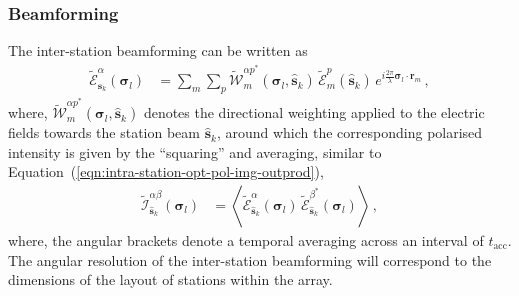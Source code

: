 \documentclass[
  journal=pasa,
  manuscript=article-type,
  year=2020,
  volume=37,
]{cup-journal}
\begin{document}
\subsubsection{Beamforming}

The inter-station beamforming 
can be written as
\begin{align}
    \widetilde{\mathcal{E}}_{\hat{\boldsymbol{s}}_k}^\alpha(\boldsymbol{\sigma}_l) &= \sum_{m} \sum_p  \widetilde{\mathcal{W}}_{m}^{{\alpha p}^*}(\boldsymbol{\sigma}_l,\hat{\boldsymbol{s}}_k) \, \widetilde{\mathcal{E}}_m^p(\hat{\boldsymbol{s}}_k) \, e^{i\frac{2\pi}{\lambda} \boldsymbol{\sigma}_l\cdot\boldsymbol{r}_{m}} \, , \label{eqn:inter-station-pol-hol-img-expl}   
\end{align}
where, $\widetilde{\mathcal{W}}_{m}^{{\alpha p}^*}(\boldsymbol{\sigma}_l,\hat{\boldsymbol{s}}_k)$ denotes the directional weighting applied to the electric fields towards the station beam $\hat{\boldsymbol{s}}_k$, around which the corresponding polarised intensity 
is given by the ``squaring'' and averaging, similar to Equation~(\ref{eqn:intra-station-opt-pol-img-outprod}),
\begin{align}
    \widetilde{\mathcal{I}}^{\alpha\beta}_{\hat{\boldsymbol{s}}_k}(\boldsymbol{\sigma}_l) &= \left\langle \widetilde{\mathcal{E}}_{\hat{\boldsymbol{s}}_k}^\alpha(\boldsymbol{\sigma}_l) \,  \widetilde{\mathcal{E}}_{\hat{\boldsymbol{s}}_k}^{\beta^*}(\boldsymbol{\sigma}_l) \right\rangle \, , \label{eqn:inter-station-opt-pol-img-outprod}
\end{align}
where, the angular brackets denote a temporal averaging across an interval of $t_\textrm{acc}$. The angular resolution of the inter-station beamforming will correspond to the dimensions of the layout of stations within the array.

\end{document}
